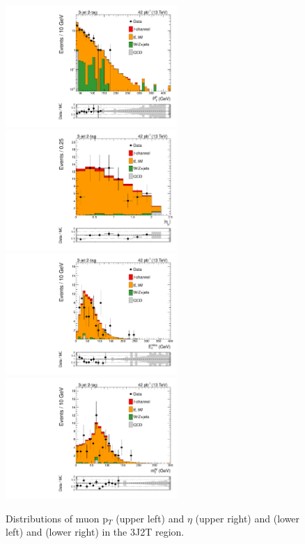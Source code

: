 \begin{figure}[hbpt]
\begin{center}
\includegraphics[width=6.5cm]{figures/3J2T/3j2t_muPt.pdf}
\includegraphics[width=6.5cm]{figures/3J2T/3j2t_mueta.pdf}
\includegraphics[width=6.5cm]{figures/3J2T/3j2t_MET.pdf}
\includegraphics[width=6.5cm]{figures/3J2T/3j2t_mt.pdf}\hfill
\caption{\label{fig:Mu_MET_3J1T} Distributions of muon p$_{T}$ (upper left) and $\eta$ (upper right) and \met (lower left) and \mt (lower right) in the 3J2T region.}
\end{center}
\end{figure}




